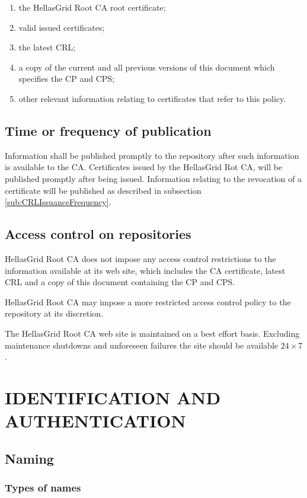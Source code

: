\documentclass[11pt,a4paper,titlepage]{book}
\begin{document}
\begin{enumerate}
\item{the HellasGrid Root CA root certificate;}
\item{valid issued certificates;}
\item{the latest CRL;}
\item{a copy of the current and all previous versions of this document which specifies the CP and CPS;}
\item{other relevant information relating to certificates that refer to this policy.}
\end{enumerate}


\section{Time or frequency of publication}

Information shall be published promptly to the repository after such information is available to the CA. Certificates issued by the HellasGrid Rot CA, will be published promptly after being issued. Information relating to the revocation of a certificate will be published as described in subsection \ref{sub:CRLIssuanceFrequency}.


\section{Access control on repositories}

HellasGrid Root CA does not impose any access control restrictions to the information available at its web site, which includes the CA certificate, latest CRL and a copy of this document containing the CP and CPS.

HellasGrid Root CA may impose a more restricted access control policy to the repository at its discretion.

The HellasGrid Root CA web site is maintained on a best effort basis. Excluding maintenance shutdowns and unforeseen failures the site should be available $24\times 7$.


\chapter{IDENTIFICATION AND AUTHENTICATION}
\section{Naming}
\subsection{Types of names}
\label{sub:TypesOfNames}
\end{document}
